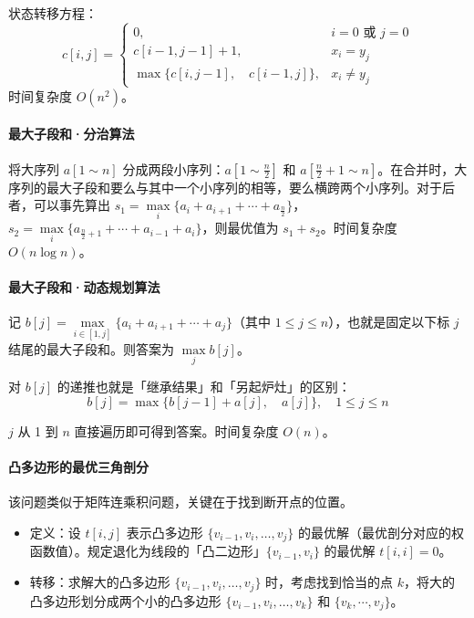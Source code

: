 \documentclass[UTF8]{ctexart}
\newcommand\Emph[1]{\textcolor{cyan!80!black}{#1}}
\begin{document}
状态转移方程：
\begin{equation*}
  c[i,j] = \begin{cases}
             0, & i=0\text{\ 或\ }j=0 \\
             c[i-1,j-1] + 1, & x_i = y_j \\
             \max\{c[i,j-1],\quad c[i-1,j]\}, & x_i\ne y_j 
           \end{cases}
\end{equation*}
\Emph{时间复杂度 $O(n^2)$。}

\paragraph{最大子段和·分治算法}
将大序列 $a[1\sim n]$ 分成两段小序列：$a[1\sim \frac n2]$ 和 $a[\frac n2+1\sim n]$。在合并时，大序列的最大子段和要么与其中一个小序列的相等，要么横跨两个小序列。对于后者，可以事先算出 $s_1 = \max\limits_{i} \{a_i + a_{i+1} + \cdots + a_{\frac{n}{2}}\}$，$s_2 = \max\limits_{i} \{a_{\frac{n}{2}+1} + \cdots + a_{i-1} + a_i\}$，则最优值为 $s_1+s_2$。\Emph{时间复杂度 $O(n\log n)$。}

\paragraph{最大子段和·动态规划算法}
记 $b[j] = \max\limits_{i\in [1,j]} \{a_i + a_{i+1} + \cdots + a_j\}$（其中 $1\leqslant j\leqslant n$），也就是固定以下标 $j$ 结尾的最大子段和。则答案为 $\max\limits_j b[j]$。

对 $b[j]$ 的递推也就是「继承结果」和「另起炉灶」的区别：
\begin{equation*}
    b[j] = \max\{b[j-1]+a[j], \quad a[j]\}, \quad 1\leqslant j\leqslant n
\end{equation*}

$j$ 从 1 到 $n$ 直接遍历即可得到答案。\Emph{时间复杂度 $O(n)$。}

\paragraph{凸多边形的最优三角剖分} 该问题类似于\Emph{矩阵连乘积}问题，关键在于找到断开点的位置。

\begin{itemize}
  \item 定义：设 $t[i,j]$ 表示凸多边形 $\{v_{i-1}, v_i, \dots, v_j\}$ 的最优解（最优剖分对应的权函数值）。规定退化为线段的「凸二边形」$\{v_{i-1},v_i\}$ 的最优解 $t[i,i]=0$。
  \item 转移：求解大的凸多边形 $\{v_{i-1}, v_i, \dots, v_j\}$ 时，考虑找到恰当的点 $k$，将大的凸多边形划分成两个小的凸多边形 $\{v_{i-1}, v_i,\dots, v_k\}$ 和 $\{v_k, \cdots, v_j\}$。
\end{itemize}
\end{document}

